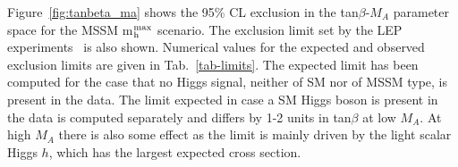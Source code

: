 \clearpage



Figure~\ref{fig:tanbeta_ma} shows the 95\% CL exclusion in the tan$\beta$-$M_{A}$ parameter space for the MSSM m$_{\rm h}^{\rm max}$ scenario. 
The exclusion limit set by the LEP experiments~\cite{LEP2-MSSM} is also shown.
Numerical values for the expected and observed exclusion limits are given in Tab.~\ref{tab-limits}. 
The expected limit has been computed for the case that no Higgs signal, neither of SM nor of MSSM type, is present in the data.
The limit expected in case a SM Higgs boson is present in the data is computed separately 
and differs by 1-2 units in tan$\beta$ at low $M_{A}$.
At high $M_{A}$ there is also some effect as the limit is mainly
driven by the light scalar Higgs $h$, which has the largest expected cross section.

